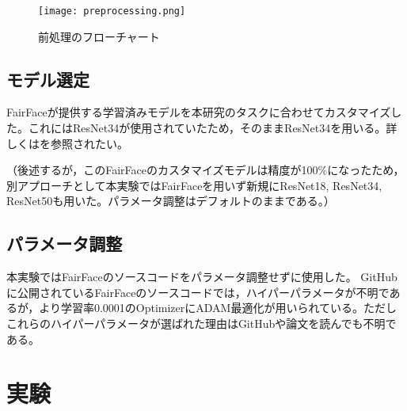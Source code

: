 \documentclass[a4paper,11pt,titlepage]{jsarticle}
\begin{document}
\begin{figure}[H]
    \centering
    \texttt{[image: preprocessing.png]}
    \caption{前処理のフローチャート}
    \label{fig:csv}
\end{figure}


\subsection{モデル選定}
FairFaceが提供する学習済みモデルを本研究のタスクに合わせてカスタマイズした。これにはResNet34が使用されていたため，そのままResNet34を用いる。詳しくは\cite{karkkainenFairFace}を参照されたい。\par
（後述するが，このFairFaceのカスタマイズモデルは精度が100\%になったため，別アプローチとして本実験ではFairFaceを用いず新規にResNet18, ResNet34, ResNet50も用いた。パラメータ調整はデフォルトのままである。）



\subsection{パラメータ調整}
本実験ではFairFaceのソースコードをパラメータ調整せずに使用した。
GitHubに公開されているFairFaceのソースコードでは，ハイパーパラメータが不明であるが，\cite{karkkainenFairFace}より学習率0.0001のOptimizerにADAM最適化が用いられている。ただしこれらのハイパーパラメータが選ばれた理由はGitHubや論文を読んでも不明である。

\section{実験}
\label{実験}
\end{document}
